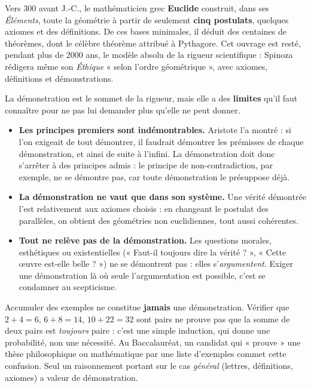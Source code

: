 \documentclass[11pt]{article}
\newcommand{\cle}[1]{{\popxbold\color{popdark}#1}}
\newcounter{popsec}
\newcounter{popsub}
\newcommand{\courssub}[1]{%
  \stepcounter{popsub}%
  \par\vspace{9pt}\noindent{\popxbold\fontsize{11.5}{13}\selectfont\color{popink}{\color{poporange}\thepopsec.\thepopsub}\hspace{6pt}#1}\par\nopagebreak\vspace{4pt}
}
\begin{document}
\begin{savaistu}
Vers 300 avant J.-C., le mathématicien grec \textbf{Euclide} construit, dans ses \emph{Éléments}, toute la géométrie à partir de seulement \textbf{cinq postulats}, quelques axiomes et des définitions. De ces bases minimales, il déduit des centaines de théorèmes, dont le célèbre théorème attribué à Pythagore. Cet ouvrage est resté, pendant plus de 2000 ans, le modèle absolu de la rigueur scientifique : Spinoza rédigera même son \emph{Éthique} « selon l'ordre géométrique », avec axiomes, définitions et démonstrations.
\end{savaistu}

\courssub{Les limites de la démonstration}

La démonstration est le sommet de la rigueur, mais elle a des \textbf{limites} qu'il faut connaître pour ne pas lui demander plus qu'elle ne peut donner.

\begin{itemize}
\item \textbf{Les principes premiers sont indémontrables.} Aristote l'a montré : si l'on exigeait de tout démontrer, il faudrait démontrer les prémisses de chaque démonstration, et ainsi de suite à l'infini. La démonstration doit donc s'arrêter à des principes admis : le principe de non-contradiction, par exemple, ne se démontre pas, car toute démonstration le présuppose déjà.
\item \textbf{La démonstration ne vaut que dans son système.} Une vérité démontrée l'est relativement aux axiomes choisis : en changeant le postulat des parallèles, on obtient des géométries non euclidiennes, tout aussi cohérentes.
\item \textbf{Tout ne relève pas de la démonstration.} Les questions morales, esthétiques ou existentielles (« Faut-il toujours dire la vérité ? », « Cette œuvre est-elle belle ? ») ne se démontrent pas : elles s'\emph{argumentent}. Exiger une démonstration là où seule l'argumentation est possible, c'est se condamner au scepticisme.
\end{itemize}

\begin{attention}
Accumuler des exemples ne constitue \textbf{jamais} une démonstration. Vérifier que $2+4=6$, $6+8=14$, $10+22=32$ sont pairs ne prouve pas que la somme de deux pairs est \emph{toujours} paire : c'est une simple \cle{induction}, qui donne une probabilité, non une nécessité. Au Baccalauréat, un candidat qui « prouve » une thèse philosophique ou mathématique par une liste d'exemples commet cette confusion. Seul un raisonnement portant sur le cas \emph{général} (lettres, définitions, axiomes) a valeur de démonstration.
\end{attention}
\end{document}
